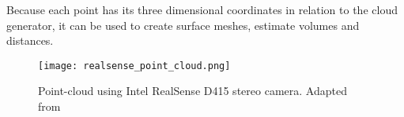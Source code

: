 Because each point has its three dimensional coordinates in relation to the cloud generator, it can be used to create surface meshes, estimate volumes and distances.

\begin{figure}[htbp]
	\centering
	\texttt{[image: realsense\_point\_cloud.png]}
	\caption{Point-cloud using Intel RealSense D415 stereo camera. Adapted from \cite{IntelRealSense_basics_depth_vision}}
	\label{fig:realsense_point_cloud}
\end{figure}


